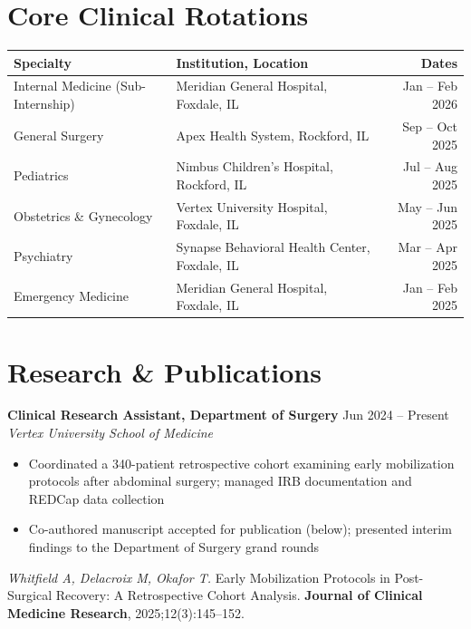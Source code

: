 \documentclass[10pt,letterpaper]{article}
\newcommand{\entryhead}[3]{%
  {\bfseries #1} \hfill {\color{midgray}\small #2}\\
  {\itshape\small #3}%
}
\begin{document}
\section{Core Clinical Rotations}
\vspace{-2pt}
\begin{tabularx}{\linewidth}{@{}p{3.6cm} X r@{}}
\toprule
\textbf{Specialty} & \textbf{Institution, Location} & \textbf{Dates} \\
\midrule
Internal Medicine (Sub-Internship) & Meridian General Hospital, Foxdale, IL & Jan -- Feb 2026 \\
General Surgery & Apex Health System, Rockford, IL & Sep -- Oct 2025 \\
Pediatrics & Nimbus Children's Hospital, Rockford, IL & Jul -- Aug 2025 \\
Obstetrics \& Gynecology & Vertex University Hospital, Foxdale, IL & May -- Jun 2025 \\
Psychiatry & Synapse Behavioral Health Center, Foxdale, IL & Mar -- Apr 2025 \\
Emergency Medicine & Meridian General Hospital, Foxdale, IL & Jan -- Feb 2025 \\
\bottomrule
\end{tabularx}

\section{Research \& Publications}

\entryhead{Clinical Research Assistant, Department of Surgery}{Jun 2024 -- Present}{Vertex University School of Medicine}
\begin{itemize}
  \item Coordinated a 340-patient retrospective cohort examining early mobilization protocols after abdominal surgery; managed IRB documentation and REDCap data collection
  \item Co-authored manuscript accepted for publication (below); presented interim findings to the Department of Surgery grand rounds
\end{itemize}

\vspace{2pt}
\textit{Whitfield A, Delacroix M, Okafor T.} Early Mobilization Protocols in Post-Surgical Recovery: A Retrospective Cohort Analysis. \textbf{Journal of Clinical Medicine Research}, 2025;12(3):145--152.
\end{document}

